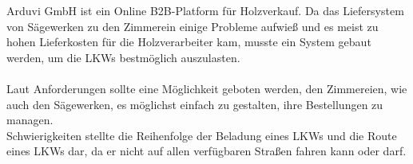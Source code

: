 Arduvi GmbH ist ein Online B2B-Platform für Holzverkauf. Da das Liefersystem von Sägewerken zu den 
Zimmerein einige Probleme aufwieß und es meist zu hohen Lieferkosten für die Holzverarbeiter kam, musste ein
System gebaut werden, um die LKWs bestmöglich auszulasten.
\\\\
Laut Anforderungen sollte eine Möglichkeit geboten werden, den Zimmereien, wie auch den Sägewerken, 
es möglichst einfach zu gestalten, ihre Bestellungen zu managen.
\\
Schwierigkeiten stellte die Reihenfolge der Beladung eines LKWs und die Route eines LKWs dar, da er nicht auf
allen verfügbaren Straßen fahren kann oder darf.
\\\\
